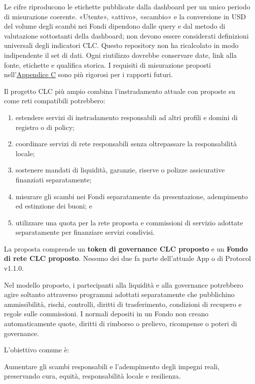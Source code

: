 \documentclass[11pt]{article}
\begin{document}
Le cifre riproducono le etichette pubblicate dalla dashboard per un unico periodo di misurazione coerente. «Utente», «attivo», «scambio» e la conversione in USD del volume degli scambi nei Fondi dipendono dalle query e dal metodo di valutazione sottostanti della dashboard; non devono essere considerati definizioni universali degli indicatori CLC. Questo repository non ha ricalcolato in modo indipendente il set di dati. Ogni riutilizzo dovrebbe conservare date, link alla fonte, etichette e qualifica storica. I requisiti di misurazione proposti nell'\href{https://docs.cosmolocal.credit/it/white-paper/appendix-c-kpi-definitions}{Appendice C} sono più rigorosi per i rapporti futuri.

Il progetto CLC più ampio combina l'instradamento attuale con proposte su come reti compatibili potrebbero:

\begin{enumerate}[leftmargin=*]
\item estendere servizi di instradamento responsabili ad altri profili e domini di registro o di policy;
\item coordinare servizi di rete responsabili senza oltrepassare la responsabilità locale;
\item sostenere mandati di liquidità, garanzie, riserve o polizze assicurative finanziati separatamente;
\item misurare gli scambi nei Fondi separatamente da presentazione, adempimento ed estinzione dei buoni; e
\item utilizzare una quota per la rete proposta e commissioni di servizio adottate separatamente per finanziare servizi condivisi.
\end{enumerate}
La proposta comprende un \textbf{token di governance CLC proposto} e un \textbf{Fondo di rete CLC proposto}. Nessuno dei due fa parte dell'attuale App o di Protocol v1.1.0.

Nel modello proposto, i partecipanti alla liquidità e alla governance potrebbero agire soltanto attraverso programmi adottati separatamente che pubblichino ammissibilità, rischi, controlli, diritti di trasferimento, condizioni di recupero e regole sulle commissioni. I normali depositi in un Fondo non creano automaticamente quote, diritti di rimborso o prelievo, ricompense o poteri di governance.

L'obiettivo comune è:

Aumentare gli scambi responsabili e l'adempimento degli impegni reali, preservando cura, equità, responsabilità locale e resilienza.
\end{document}
